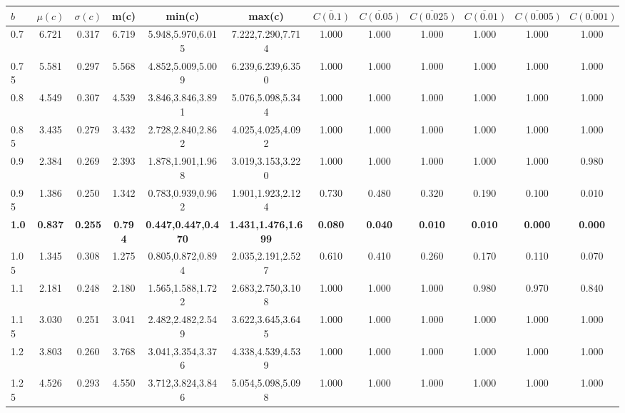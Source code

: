 \begin{table*}[h!]
\begin{center}
\begin{tabular}{| l | c | c | c | c | c | c | c | c | c | c | c |}\hline
$b$ & $\mu(c)$ & $\sigma(c)$ & m(c) & min(c) & max(c) & $\overline{C(0.1)}$ & $\overline{C(0.05)}$ & $\overline{C(0.025)}$ & $\overline{C(0.01)}$ & $\overline{C(0.005)}$ & $\overline{C(0.001)}$ \\\hline\hline
0.7 & 6.721 & 0.317 & 6.719 & 5.948,5.970,6.015 & 7.222,7.290,7.714  & 1.000  & 1.000  & 1.000  & 1.000  & 1.000  & 1.000 \\\hline
0.75 & 5.581 & 0.297 & 5.568 & 4.852,5.009,5.009 & 6.239,6.239,6.350  & 1.000  & 1.000  & 1.000  & 1.000  & 1.000  & 1.000 \\\hline
0.8 & 4.549 & 0.307 & 4.539 & 3.846,3.846,3.891 & 5.076,5.098,5.344  & 1.000  & 1.000  & 1.000  & 1.000  & 1.000  & 1.000 \\\hline
0.85 & 3.435 & 0.279 & 3.432 & 2.728,2.840,2.862 & 4.025,4.025,4.092  & 1.000  & 1.000  & 1.000  & 1.000  & 1.000  & 1.000 \\\hline
0.9 & 2.384 & 0.269 & 2.393 & 1.878,1.901,1.968 & 3.019,3.153,3.220  & 1.000  & 1.000  & 1.000  & 1.000  & 1.000  & 0.980 \\\hline
0.95 & 1.386 & 0.250 & 1.342 & 0.783,0.939,0.962 & 1.901,1.923,2.124  & 0.730  & 0.480  & 0.320  & 0.190  & 0.100  & 0.010 \\\hline
{\bf 1.0} & {\bf 0.837} & {\bf 0.255} & {\bf 0.794} & {\bf 0.447,0.447,0.470} & {\bf 1.431,1.476,1.699} & {\bf 0.080} & {\bf 0.040} & {\bf 0.010} & {\bf 0.010} & {\bf 0.000} & {\bf 0.000} \\\hline
1.05 & 1.345 & 0.308 & 1.275 & 0.805,0.872,0.894 & 2.035,2.191,2.527  & 0.610  & 0.410  & 0.260  & 0.170  & 0.110  & 0.070 \\\hline
1.1 & 2.181 & 0.248 & 2.180 & 1.565,1.588,1.722 & 2.683,2.750,3.108  & 1.000  & 1.000  & 1.000  & 0.980  & 0.970  & 0.840 \\\hline
1.15 & 3.030 & 0.251 & 3.041 & 2.482,2.482,2.549 & 3.622,3.645,3.645  & 1.000  & 1.000  & 1.000  & 1.000  & 1.000  & 1.000 \\\hline
1.2 & 3.803 & 0.260 & 3.768 & 3.041,3.354,3.376 & 4.338,4.539,4.539  & 1.000  & 1.000  & 1.000  & 1.000  & 1.000  & 1.000 \\\hline
1.25 & 4.526 & 0.293 & 4.550 & 3.712,3.824,3.846 & 5.054,5.098,5.098  & 1.000  & 1.000  & 1.000  & 1.000  & 1.000  & 1.000 \\\hline

\end{tabular}
\end{center}
\end{table*}
